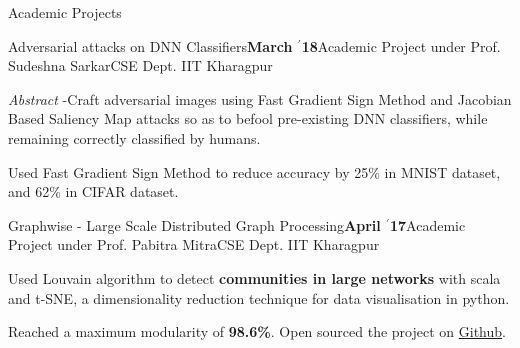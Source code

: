 \documentclass{resume} %
\begin{document}
\begin{rSection}{Academic Projects}


\begin{rSubsection}{ \large Adversarial attacks on DNN Classifiers}{\textbf{\large March $^{\prime}$18}}{Academic Project under Prof. Sudeshna Sarkar}{CSE Dept. IIT Kharagpur}

\item \textit{Abstract} -Craft adversarial images using Fast Gradient Sign Method and Jacobian Based Saliency Map attacks so as to befool pre-existing DNN classifiers, while remaining correctly classified by humans. 
\item Used Fast Gradient Sign Method to reduce accuracy by 25\% in MNIST dataset, and 62\% in CIFAR dataset.
\end{rSubsection}

\begin{rSubsection}{ \large Graphwise - Large Scale Distributed Graph Processing}{\textbf{\large April $^{\prime}$17}}{Academic Project under Prof. Pabitra Mitra}{CSE Dept. IIT Kharagpur}

\item Used Louvain algorithm to detect \textbf{communities in large networks} with scala and t-SNE, a dimensionality reduction technique for data visualisation in python.

\item Reached a maximum modularity of \textbf{98.6\%}. Open sourced the project on \href{https://github.com/kaustubhhiware/Graphwise}{Github}.
\end{rSubsection}


\end{rSection}
\end{document}
